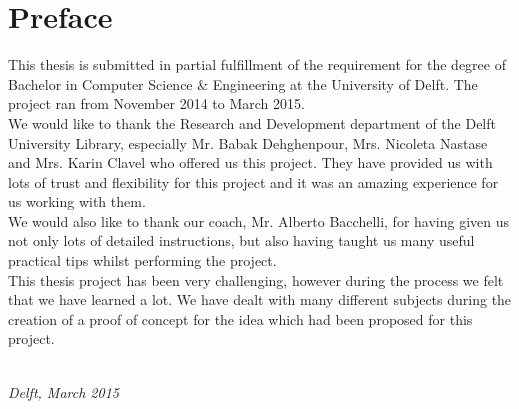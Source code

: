 \chapter*{Preface}

This thesis is submitted in partial fulfillment of the requirement for the degree of Bachelor in Computer Science \& Engineering at the University of Delft. The project ran from November 2014 to March 2015.\\

We would like to thank the Research and Development department of the Delft University Library, especially Mr. Babak Dehghenpour, Mrs. Nicoleta Nastase and Mrs. Karin Clavel who offered us this project. They have provided us with lots of trust and flexibility for this project and it was an amazing experience for us working with them.\\

We would also like to thank our coach, Mr. Alberto Bacchelli, for having given us not only lots of detailed instructions, but also having taught us many useful practical tips whilst performing the project.\\

This thesis project has been very challenging, however during the process we felt that we have learned a lot. We have dealt with many different subjects during the creation of a proof of concept for the idea which had been proposed for this project.  


\begin{flushright}
{\makeatletter\itshape
    \@author \\
    Delft, March 2015
\makeatother}
\end{flushright}

